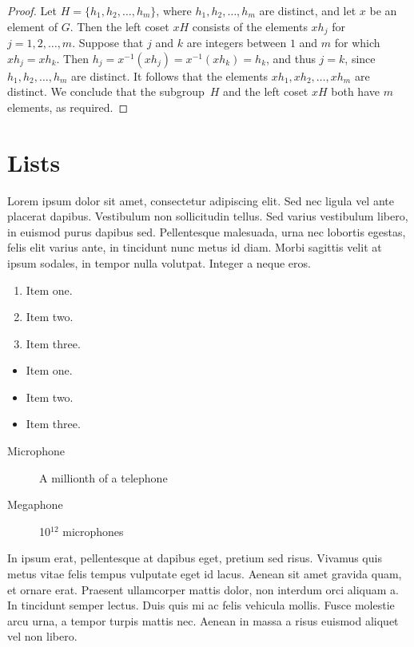 \begin{proof}
    Let $H = \{ h_1, h_2,\ldots, h_m\}$, where
    $h_1, h_2,\ldots, h_m$ are distinct, and let $x$ be an
    element of $G$.  Then the left coset $xH$ consists of
    the elements $x h_j$ for $j = 1,2,\ldots,m$.
    Suppose that $j$ and $k$ are integers between
    $1$ and $m$ for which $x h_j = x h_k$.  Then
    $h_j = x^{-1} (x h_j) = x^{-1} (x h_k) = h_k$,
    and thus $j = k$, since $h_1, h_2,\ldots, h_m$
    are distinct.  It follows that the elements
    $x h_1, x h_2,\ldots, x h_m$ are distinct.
    We conclude that the subgroup~$H$ and the left
    coset $xH$ both have $m$ elements,
    as required.
\end{proof}

\section{Lists}
Lorem ipsum dolor sit amet, consectetur adipiscing elit. Sed nec ligula vel
ante placerat dapibus. Vestibulum non sollicitudin tellus. Sed varius
vestibulum libero, in euismod purus dapibus sed. Pellentesque malesuada, urna
nec lobortis egestas, felis elit varius ante, in tincidunt nunc metus id diam.
Morbi sagittis velit at ipsum sodales, in tempor nulla volutpat. Integer a
neque eros.

\begin{enumerate}
    \item Item one.
    \item Item two.
    \item Item three.
\end{enumerate}

\begin{itemize}
    \item Item one.
    \item Item two.
    \item Item three.
\end{itemize}

\begin{description}
    \item[Microphone] A millionth of a telephone
    \item[Megaphone] 10$^{12}$ microphones
\end{description}

In ipsum erat, pellentesque at dapibus eget, pretium sed risus.
Vivamus quis metus vitae felis tempus vulputate eget id lacus. Aenean sit amet
gravida quam, et ornare erat. Praesent ullamcorper mattis dolor, non interdum
orci aliquam a. In tincidunt semper lectus. Duis quis mi ac felis vehicula
mollis. Fusce molestie arcu urna, a tempor turpis mattis nec. Aenean in massa a
risus euismod aliquet vel non libero.

